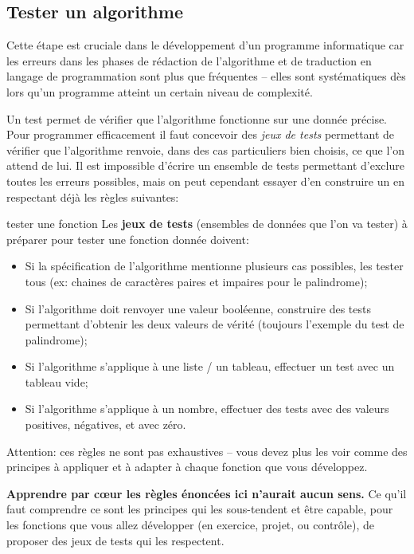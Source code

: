 \documentclass[12pt]{article}
\begin{document}
	\subsection{Tester un algorithme}
	
	Cette étape est cruciale dans le développement d'un programme informatique car les erreurs dans les phases de rédaction de l'algorithme et de traduction en langage de programmation sont plus que fréquentes -- elles sont systématiques dès lors qu'un programme atteint un certain niveau de complexité.
	
	Un test permet de vérifier que l'algorithme fonctionne sur une donnée précise. Pour programmer efficacement il faut concevoir des \textit{jeux de tests} permettant de vérifier que l’algorithme renvoie, dans des cas particuliers bien choisis, ce que l’on attend de lui. Il est impossible d'écrire un ensemble de tests permettant d’exclure toutes les erreurs possibles, mais on peut cependant essayer d'en construire un en respectant déjà les règles suivantes:
	
	\begin{MaRgl}{tester une fonction}
			 Les \textbf{jeux de tests} (ensembles de données que l'on va tester) à préparer pour tester une fonction donnée doivent:
			 \begin{itemize}
			 	\item Si la spécification de l'algorithme mentionne plusieurs cas possibles, les tester tous (ex: chaines de caractères paires et impaires pour le palindrome);
			 	\item Si l'algorithme doit renvoyer une valeur booléenne, construire des tests permettant d’obtenir les deux valeurs de vérité (toujours l'exemple du test de palindrome);
			 	\item Si l'algorithme s'applique à une liste / un tableau, effectuer un test avec un tableau vide;
			 	\item Si l'algorithme s'applique à un nombre, effectuer des tests avec des valeurs positives, négatives, et avec zéro.
			 \end{itemize}
			 \vspace{\baselineskip}
			 
			Attention: ces règles ne sont pas exhaustives -- vous devez plus les voir comme des principes à appliquer et à adapter à chaque fonction que vous développez.
	\end{MaRgl}
	
	\begin{MonRet}
		 	\textbf{Apprendre par cœur les règles énoncées ici n'aurait aucun sens.} Ce qu'il faut comprendre ce sont les principes qui les sous-tendent et être capable, pour les fonctions que vous allez développer (en exercice, projet, ou contrôle), de proposer des jeux de tests qui les respectent.
	\end{MonRet}
	
\end{document}
